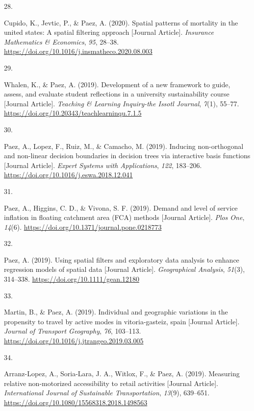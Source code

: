 \documentclass[10pt,a4paper,]{twentysecondcv}
\newlength{\csllabelwidth}
\newcommand{\CSLLeftMargin}[1]{\parbox[t]{\csllabelwidth}{#1}}
\newcommand{\CSLRightInline}[1]{\parbox[t]{\linewidth - \csllabelwidth}{#1}}
\begin{document}
\leavevmode{}%
\CSLLeftMargin{28. }%
\CSLRightInline{Cupido, K., Jevtic, P., \& Paez, A. (2020). Spatial
patterns of mortality in the united states: A spatial filtering approach
{[}Journal Article{]}. \emph{Insurance Mathematics \& Economics},
\emph{95}, 28--38.
\url{https://doi.org/10.1016/j.insmatheco.2020.08.003}}

\leavevmode{}%
\CSLLeftMargin{29. }%
\CSLRightInline{Whalen, K., \& Paez, A. (2019). Development of a new
framework to guide, assess, and evaluate student reflections in a
university sustainability course {[}Journal Article{]}. \emph{Teaching
\& Learning Inquiry-the Issotl Journal}, \emph{7}(1), 55--77.
\url{https://doi.org/10.20343/teachlearninqu.7.1.5}}

\leavevmode{}%
\CSLLeftMargin{30. }%
\CSLRightInline{Paez, A., Lopez, F., Ruiz, M., \& Camacho, M. (2019).
Inducing non-orthogonal and non-linear decision boundaries in decision
trees via interactive basis functions {[}Journal Article{]}.
\emph{Expert Systems with Applications}, \emph{122}, 183--206.
\url{https://doi.org/10.1016/j.eswa.2018.12.041}}

\leavevmode{}%
\CSLLeftMargin{31. }%
\CSLRightInline{Paez, A., Higgins, C. D., \& Vivona, S. F. (2019).
Demand and level of service inflation in floating catchment area (FCA)
methods {[}Journal Article{]}. \emph{Plos One}, \emph{14}(6).
\url{https://doi.org/10.1371/journal.pone.0218773}}

\leavevmode{}%
\CSLLeftMargin{32. }%
\CSLRightInline{Paez, A. (2019). Using spatial filters and exploratory
data analysis to enhance regression models of spatial data {[}Journal
Article{]}. \emph{Geographical Analysis}, \emph{51}(3), 314--338.
\url{https://doi.org/10.1111/gean.12180}}

\leavevmode{}%
\CSLLeftMargin{33. }%
\CSLRightInline{Martin, B., \& Paez, A. (2019). Individual and
geographic variations in the propensity to travel by active modes in
vitoria-gasteiz, spain {[}Journal Article{]}. \emph{Journal of Transport
Geography}, \emph{76}, 103--113.
\url{https://doi.org/10.1016/j.jtrangeo.2019.03.005}}

\leavevmode{}%
\CSLLeftMargin{34. }%
\CSLRightInline{Arranz-Lopez, A., Soria-Lara, J. A., Witlox, F., \&
Paez, A. (2019). Measuring relative non-motorized accessibility to
retail activities {[}Journal Article{]}. \emph{International Journal of
Sustainable Transportation}, \emph{13}(9), 639--651.
\url{https://doi.org/10.1080/15568318.2018.1498563}}
\end{document}
